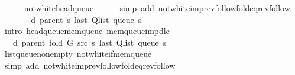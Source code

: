\begin{isabellebody}
\ \ \ \ \isamarkupfalse%
\ not{\isacharunderscore}{\kern0pt}white{\isacharunderscore}{\kern0pt}head{\isacharunderscore}{\kern0pt}queue\isanewline
\ \ \ \ \isamarkupfalse%
\ {\isacharparenleft}{\kern0pt}simp\ add{\isacharcolon}{\kern0pt}\ not{\isacharunderscore}{\kern0pt}white{\isacharunderscore}{\kern0pt}imp{\isacharunderscore}{\kern0pt}rev{\isacharunderscore}{\kern0pt}follow{\isacharunderscore}{\kern0pt}fold{\isacharunderscore}{\kern0pt}eq{\isacharunderscore}{\kern0pt}rev{\isacharunderscore}{\kern0pt}follow{\isacharparenright}{\kern0pt}\isanewline
\ \ \isamarkupfalse%
\ \isamarkupfalse%
\ {\isachardoublequoteopen}{\isachardot}{\kern0pt}{\isachardot}{\kern0pt}{\isachardot}{\kern0pt}\ {\isasymle}\ d\ {\isacharparenleft}{\kern0pt}parent\ s{\isacharparenright}{\kern0pt}\ {\isacharparenleft}{\kern0pt}last\ {\isacharparenleft}{\kern0pt}Q{\isacharunderscore}{\kern0pt}list\ {\isacharparenleft}{\kern0pt}queue\ s{\isacharparenright}{\kern0pt}{\isacharparenright}{\kern0pt}{\isacharparenright}{\kern0pt}{\isachardoublequoteclose}\isanewline
\ \ \ \ \isamarkupfalse%
\ {\isacharparenleft}{\kern0pt}intro\ head{\isacharunderscore}{\kern0pt}queue{\isacharunderscore}{\kern0pt}mem{\isacharunderscore}{\kern0pt}queue\ mem{\isacharunderscore}{\kern0pt}queue{\isacharunderscore}{\kern0pt}imp{\isacharunderscore}{\kern0pt}d{\isacharunderscore}{\kern0pt}le{\isacharparenright}{\kern0pt}\isanewline
\ \ \isamarkupfalse%
\ \isamarkupfalse%
\ {\isachardoublequoteopen}{\isachardot}{\kern0pt}{\isachardot}{\kern0pt}{\isachardot}{\kern0pt}\ {\isacharequal}{\kern0pt}\ d\ {\isacharparenleft}{\kern0pt}parent\ {\isacharparenleft}{\kern0pt}fold\ G\ src\ s{\isacharparenright}{\kern0pt}{\isacharparenright}{\kern0pt}\ {\isacharparenleft}{\kern0pt}last\ {\isacharparenleft}{\kern0pt}Q{\isacharunderscore}{\kern0pt}list\ {\isacharparenleft}{\kern0pt}queue\ s{\isacharparenright}{\kern0pt}{\isacharparenright}{\kern0pt}{\isacharparenright}{\kern0pt}{\isachardoublequoteclose}\isanewline
\ \ \ \ \isamarkupfalse%
\ list{\isacharunderscore}{\kern0pt}queue{\isacharunderscore}{\kern0pt}non{\isacharunderscore}{\kern0pt}empty\ not{\isacharunderscore}{\kern0pt}white{\isacharunderscore}{\kern0pt}if{\isacharunderscore}{\kern0pt}mem{\isacharunderscore}{\kern0pt}queue\isanewline
\ \ \ \ \isamarkupfalse%
\ {\isacharparenleft}{\kern0pt}simp\ add{\isacharcolon}{\kern0pt}\ not{\isacharunderscore}{\kern0pt}white{\isacharunderscore}{\kern0pt}imp{\isacharunderscore}{\kern0pt}rev{\isacharunderscore}{\kern0pt}follow{\isacharunderscore}{\kern0pt}fold{\isacharunderscore}{\kern0pt}eq{\isacharunderscore}{\kern0pt}rev{\isacharunderscore}{\kern0pt}follow{\isacharparenright}{\kern0pt}\isanewline

\end{isabellebody}
